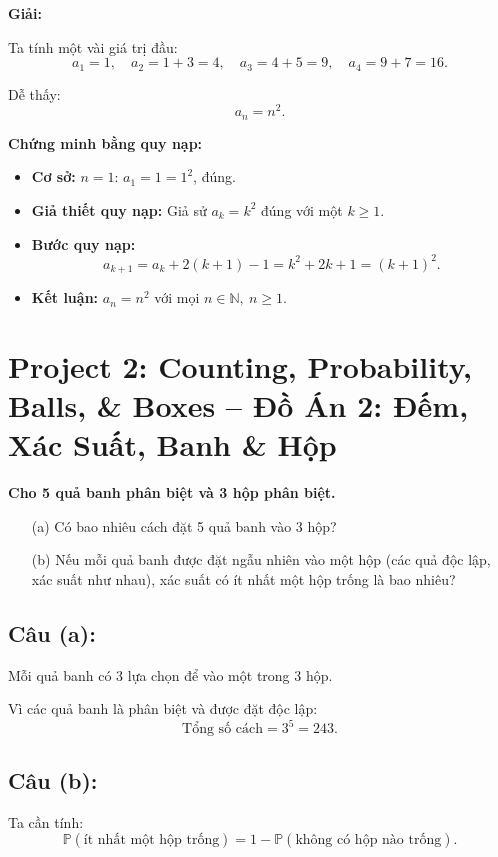\documentclass{article}
\begin{document}
	\textbf{Giải:}
	
	Ta tính một vài giá trị đầu:
	\[
	a_1 = 1,\quad a_2 = 1 + 3 = 4,\quad a_3 = 4 + 5 = 9,\quad a_4 = 9 + 7 = 16.
	\]
	
	Dễ thấy:
	\[
	a_n = n^2.
	\]
	
	\textbf{Chứng minh bằng quy nạp:}
	
	\begin{itemize}[leftmargin=1.5cm]
		\item \textbf{Cơ sở:} $n = 1$: $a_1 = 1 = 1^2$, đúng.
		
		\item \textbf{Giả thiết quy nạp:} Giả sử $a_k = k^2$ đúng với một $k \ge 1$.
		
		\item \textbf{Bước quy nạp:}
		\[
		a_{k+1} = a_k + 2(k+1) - 1 = k^2 + 2k + 1 = (k+1)^2.
		\]
		
		\item \textbf{Kết luận:} $a_n = n^2$ với mọi $n \in \mathbb{N},\ n \ge 1$.
	\end{itemize}
	
	\section*{Project 2: Counting, Probability, Balls, \& Boxes -- Đồ Án 2: Đếm, Xác Suất, Banh \& Hộp}
	
	\textbf{Cho 5 quả banh phân biệt và 3 hộp phân biệt.}
	
	\begin{itemize}[leftmargin=1.5cm]
		\item[(a)] Có bao nhiêu cách đặt 5 quả banh vào 3 hộp?
		\item[(b)] Nếu mỗi quả banh được đặt ngẫu nhiên vào một hộp (các quả độc lập, xác suất như nhau), xác suất có ít nhất một hộp trống là bao nhiêu?
	\end{itemize}
	
	\subsection*{Câu (a):}
	Mỗi quả banh có 3 lựa chọn để vào một trong 3 hộp.
	
	Vì các quả banh là phân biệt và được đặt độc lập:
	\[
	\text{Tổng số cách} = 3^5 = 243.
	\]
	
	\subsection*{Câu (b):}
	Ta cần tính:
	\[
	\mathbb{P}(\text{ít nhất một hộp trống}) = 1 - \mathbb{P}(\text{không có hộp nào trống}).
	\]
	
\end{document}
